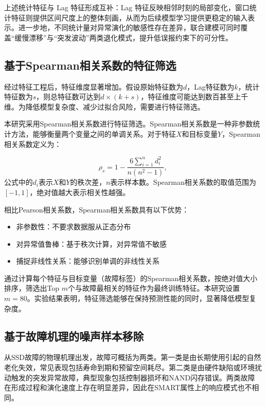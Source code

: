 上述统计特征与 Lag 特征形成互补：Lag 特征反映相邻时刻的局部变化，窗口统计特征则提供区间尺度上的整体刻画，从而为后续模型学习提供更稳定的输入表示。进一步地，不同统计量对异常演化的敏感性存在差异，联合建模可同时覆盖“缓慢漂移”与“突发波动”两类退化模式，提升低误报约束下的可分性。

\subsection{基于Spearman相关系数的特征筛选}

经过特征工程后，特征维度显著增加。假设原始特征数为$d$，Lag特征数为$k$，统计特征数为$s$，则总特征数可达到$d \times (k + s)$，特征维度可能达到数百甚至上千维。为降低模型复杂度、减少过拟合风险，需要进行特征筛选。

本研究采用Spearman相关系数进行特征筛选。Spearman相关系数是一种非参数统计方法，能够衡量两个变量之间的单调关系。对于特征$X$和目标变量$Y$，Spearman相关系数定义为：

\begin{equation}
    \label{equ:spearman}
    \rho_s = 1 - \frac{6\sum_{i=1}^{n} d_i^2}{n(n^2-1)},
\end{equation}
公式中的$d_i$表示$X$和$Y$的秩次差，$n$表示样本数。Spearman相关系数的取值范围为$[-1, 1]$，绝对值越大表示相关性越强。

相比Pearson相关系数，Spearman相关系数具有以下优势：
\begin{itemize}
    \item 非参数性：不要求数据服从正态分布
    \item 对异常值鲁棒：基于秩次计算，对异常值不敏感
    \item 捕捉非线性关系：能够识别单调的非线性关系
\end{itemize}

通过计算每个特征与目标变量（故障标签）的Spearman相关系数，按绝对值大小排序，筛选出Top $m$个与故障最相关的特征作为最终训练特征。本研究设置$m=80$。实验结果表明，特征筛选能够在保持预测性能的同时，显著降低模型复杂度。

\subsection{基于故障机理的噪声样本移除}

从SSD故障的物理机理出发，故障可概括为两类。第一类是由长期使用引起的自然老化失效，常见表现包括寿命到期和预留空间耗尽。第二类是由硬件缺陷或环境扰动触发的突发异常故障，典型现象包括控制器损坏和NAND闪存错误。两类故障在形成过程和演化速度上存在明显差异，因此在SMART属性上的响应模式也不相同。

